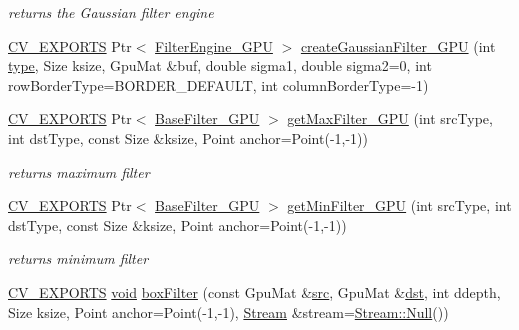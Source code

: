 \begin{DoxyCompactItemize}
\begin{DoxyCompactList}\small\item\em returns the Gaussian filter engine \end{DoxyCompactList}\item 
\hyperlink{core_2types__c_8h_a1bf9f0e121b54272da02379cfccd0a2b}{C\-V\-\_\-\-E\-X\-P\-O\-R\-T\-S} Ptr$<$ \hyperlink{classcv_1_1gpu_1_1FilterEngine__GPU}{Filter\-Engine\-\_\-\-G\-P\-U} $>$ \hyperlink{namespacecv_1_1gpu_ae46289ae18c068ddbafe5efe0638d035}{create\-Gaussian\-Filter\-\_\-\-G\-P\-U} (int \hyperlink{imgproc__c_8h_a84612d8738bf935200cf32a103d8efe1}{type}, Size ksize, Gpu\-Mat \&buf, double sigma1, double sigma2=0, int row\-Border\-Type=B\-O\-R\-D\-E\-R\-\_\-\-D\-E\-F\-A\-U\-L\-T, int column\-Border\-Type=-\/1)
\item 
\hyperlink{core_2types__c_8h_a1bf9f0e121b54272da02379cfccd0a2b}{C\-V\-\_\-\-E\-X\-P\-O\-R\-T\-S} Ptr$<$ \hyperlink{classcv_1_1gpu_1_1BaseFilter__GPU}{Base\-Filter\-\_\-\-G\-P\-U} $>$ \hyperlink{namespacecv_1_1gpu_ac63d2004163889ce9ee542aa6825e40d}{get\-Max\-Filter\-\_\-\-G\-P\-U} (int src\-Type, int dst\-Type, const Size \&ksize, Point anchor=Point(-\/1,-\/1))
\begin{DoxyCompactList}\small\item\em returns maximum filter \end{DoxyCompactList}\item 
\hyperlink{core_2types__c_8h_a1bf9f0e121b54272da02379cfccd0a2b}{C\-V\-\_\-\-E\-X\-P\-O\-R\-T\-S} Ptr$<$ \hyperlink{classcv_1_1gpu_1_1BaseFilter__GPU}{Base\-Filter\-\_\-\-G\-P\-U} $>$ \hyperlink{namespacecv_1_1gpu_a32a75aa2b5efdab8e932988950b76cdd}{get\-Min\-Filter\-\_\-\-G\-P\-U} (int src\-Type, int dst\-Type, const Size \&ksize, Point anchor=Point(-\/1,-\/1))
\begin{DoxyCompactList}\small\item\em returns minimum filter \end{DoxyCompactList}\item 
\hyperlink{core_2types__c_8h_a1bf9f0e121b54272da02379cfccd0a2b}{C\-V\-\_\-\-E\-X\-P\-O\-R\-T\-S} \hyperlink{legacy_8hpp_a8bb47f092d473522721002c86c13b94e}{void} \hyperlink{namespacecv_1_1gpu_acfa94fd01be8c3b6a9468f5890ed79c7}{box\-Filter} (const Gpu\-Mat \&\hyperlink{legacy_8hpp_a371cd109b74033bc4366f584edd3dacc}{src}, Gpu\-Mat \&\hyperlink{photo__c_8h_aed13e2a25279b24dc954073233fef7a5}{dst}, int ddepth, Size ksize, Point anchor=Point(-\/1,-\/1), \hyperlink{classcv_1_1gpu_1_1Stream}{Stream} \&stream=\hyperlink{classcv_1_1gpu_1_1Stream_af96c23564834f88333dcb8997df553f1}{Stream\-::\-Null}())

\end{DoxyCompactItemize}
